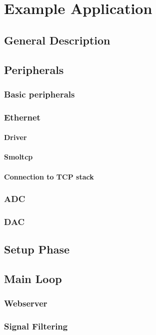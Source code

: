 \chapter{Example Application}

\section{General Description}


\section{Peripherals}


\subsection{Basic peripherals}

\subsection{Ethernet}

\subsubsection{Driver}
\subsubsection{Smoltcp}
\subsubsection{Connection to TCP stack}

\subsection{ADC}

\subsection{DAC}


\section{Setup Phase}


\section{Main Loop}

\subsection{Webserver}

\subsection{Signal Filtering}
